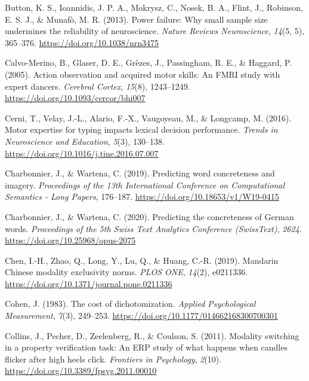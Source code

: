 \documentclass[
  12pt,
  man,floatsintext]{apa7}
\newlength{\cslhangindent}
\newlength{\cslentryspacingunit} %
\newenvironment{CSLReferences}[2] %
 {%
  \setlength{\parindent}{0pt}
  \ifodd #1
  \let\oldpar\par
  \def\par{\hangindent=\cslhangindent\oldpar}
  \fi
  \setlength{\parskip}{#2\cslentryspacingunit}
 }%
 {}
\begin{document}
\begin{CSLReferences}{1}{0}
\leavevmode{}%
Button, K. S., Ioannidis, J. P. A., Mokrysz, C., Nosek, B. A., Flint, J., Robinson, E. S. J., \& Munafò, M. R. (2013). Power failure: {Why} small sample size undermines the reliability of neuroscience. \emph{Nature Reviews Neuroscience}, \emph{14}(5, 5), 365--376. \url{https://doi.org/10.1038/nrn3475}

\leavevmode{}%
Calvo-Merino, B., Glaser, D. E., Grèzes, J., Passingham, R. E., \& Haggard, P. (2005). Action observation and acquired motor skills: {An} {FMRI} study with expert dancers. \emph{Cerebral Cortex}, \emph{15}(8), 1243--1249. \url{https://doi.org/10.1093/cercor/bhi007}

\leavevmode{}%
Cerni, T., Velay, J.-L., Alario, F.-X., Vaugoyeau, M., \& Longcamp, M. (2016). Motor expertise for typing impacts lexical decision performance. \emph{Trends in Neuroscience and Education}, \emph{5}(3), 130--138. \url{https://doi.org/10.1016/j.tine.2016.07.007}

\leavevmode{}%
Charbonnier, J., \& Wartena, C. (2019). Predicting word concreteness and imagery. \emph{Proceedings of the 13th {International Conference} on {Computational Semantics} - {Long Papers}}, 176--187. \url{https://doi.org/10.18653/v1/W19-0415}

\leavevmode{}%
Charbonnier, J., \& Wartena, C. (2020). Predicting the concreteness of {German} words. \emph{Proceedings of the 5th {Swiss Text Analytics Conference} ({SwissText})}, \emph{2624}. \url{https://doi.org/10.25968/opus-2075}

\leavevmode{}%
Chen, I.-H., Zhao, Q., Long, Y., Lu, Q., \& Huang, C.-R. (2019). Mandarin {Chinese} modality exclusivity norms. \emph{PLOS ONE}, \emph{14}(2), e0211336. \url{https://doi.org/10.1371/journal.pone.0211336}

\leavevmode{}%
Cohen, J. (1983). The cost of dichotomization. \emph{Applied Psychological Measurement}, \emph{7}(3), 249--253. \url{https://doi.org/10.1177/014662168300700301}

\leavevmode{}%
Collins, J., Pecher, D., Zeelenberg, R., \& Coulson, S. (2011). Modality switching in a property verification task: {An} {ERP} study of what happens when candles flicker after high heels click. \emph{Frontiers in Psychology}, \emph{2}(10). \url{https://doi.org/10.3389/fpsyg.2011.00010}


\end{CSLReferences}
\end{document}
